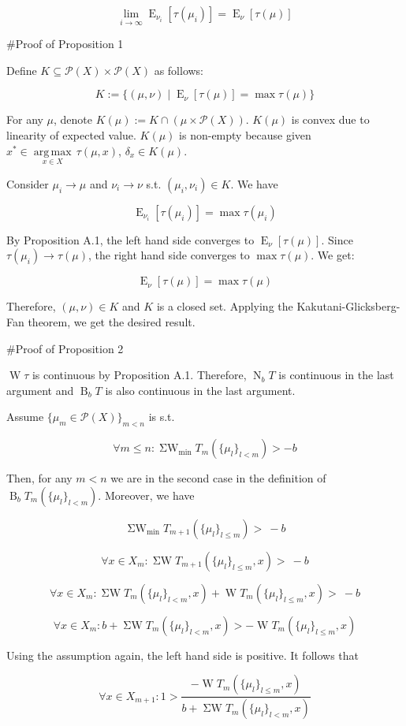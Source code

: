 \documentclass[a4paper]{article}
\DeclareMathOperator{\E}{E}
\newcommand{\Argmax}[1]{\underset{#1}{\operatorname{arg\,max}}\,}
\newcommand{\Prob}{\mathcal{P}}
\newcommand{\B}{\operatorname{B}_b}
\newcommand{\N}{\operatorname{N}_b}
\newcommand{\W}{\operatorname{W}}
\newcommand{\SW}{\operatorname{\Sigma W}}
\newcommand{\SWm}{\operatorname{\Sigma W}_{\min}}
\begin{document}
$$\lim_{i \rightarrow \infty} \E_{\nu_i}[\tau(\mu_i)] = \E_{\nu}[\tau(\mu)]$$

\#Proof of Proposition 1

Define ${K \subseteq \Prob(X) \times \Prob(X)}$ as follows:

$$K:=\{(\mu,\nu) \mid \E_\nu[\tau(\mu)] = \max \tau(\mu)\}$$

For any ${\mu}$, denote ${K(\mu):=K \cap (\mu \times \Prob(X))}$. ${K}(\mu)$ is convex due to linearity of expected value. ${K(\mu)}$ is non-empty because given ${x^* \in \Argmax{x \in X} \tau(\mu,x)}$, ${\delta_x \in K(\mu)}$.

Consider ${\mu_i \rightarrow \mu}$ and ${\nu_i \rightarrow \nu}$ s.t. ${(\mu_i,\nu_i) \in K}$. We have

$$\E_{\nu_i}[\tau(\mu_i)] = \max \tau(\mu_i)$$

By Proposition A.1, the left hand side converges to ${\E_{\nu}[\tau(\mu)]}$. Since ${\tau(\mu_i) \rightarrow \tau(\mu)}$, the right hand side converges to ${\max \tau(\mu)}$. We get:

$$\E_{\nu}[\tau(\mu)] = \max \tau(\mu)$$

Therefore, ${(\mu,\nu) \in K}$ and ${K}$ is a closed set. Applying the Kakutani-Glicksberg-Fan theorem, we get the desired result.

\#Proof of Proposition 2

${\W \tau}$ is continuous by Proposition A.1. Therefore, ${\N T}$ is continuous in the last argument and ${\B T}$ is also continuous in the last argument.

Assume ${\{\mu_m \in \Prob(X)\}_{m<n}}$ is s.t. 

$$\forall m \leq n: \SWm T_m(\{\mu_l\}_{l<m}) > -b$$ 

Then, for any ${m < n}$ we are in the second case in the definition of ${\B T_m(\{\mu_l\}_{l<m})}$. Moreover, we have

$$\SWm T_{m+1}(\{\mu_l\}_{l \leq m}) >\ -b$$

$$\forall x \in X_{m}: \SW T_{m+1}(\{\mu_l\}_{l \leq m}, x) >\ -b$$

$$\forall x \in X_{m}: \SW T_{m}(\{\mu_l\}_{l < m}, x) + \W T_{m}(\{\mu_l\}_{l \leq m}, x)  >\ -b$$

$$\forall x \in X_{m}: b + \SW T_{m}(\{\mu_l\}_{l < m}, x) > -\W T_{m}(\{\mu_l\}_{l \leq m}, x)$$

Using the assumption again, the left hand side is positive. It follows that

$$\forall x \in X_{m+1}: 1 > \frac{-\W T_{m}(\{\mu_l\}_{l \leq m}, x)}{b + \SW T_{m}(\{\mu_l\}_{l < m}, x)}$$
\end{document}
